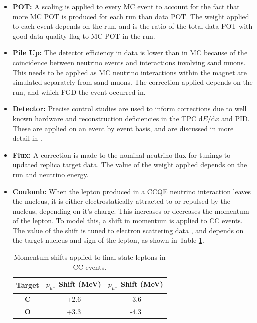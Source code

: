 \begin{itemize}

\item \textbf{POT: } A scaling is applied to every MC event to account for the fact that more MC POT is produced for each run than data POT. The weight applied to each event depends on the run, and is the ratio of the total data POT with good data quality flag to MC POT in the run.

\item \textbf{Pile Up: } The detector efficiency in data is lower than in MC because of the coincidence between neutrino events and interactions involving sand muons. This needs to be applied as MC neutrino interactions within the magnet are simulated separately from sand muons. The correction applied depends on the run, and which FGD the event occurred in.

\item \textbf{Detector: } Precise control studies are used to inform corrections due to well known hardware and reconstruction deficiencies in the TPC d$E/$d$x$ and PID. These are applied on an event by event basis, and are discussed in more detail in \cite{tn212}.

\item \textbf{Flux: } A correction is made to the nominal neutrino flux for tunings to updated replica target data. The value of the weight applied depends on the run and neutrino energy.

\item \textbf{Coulomb: } When the lepton produced in a CCQE neutrino interaction leaves the nucleus, it is either electrostatically attracted to or repulsed by the nucleus, depending on it's charge. This increases or decreases the momentum of the lepton. To model this, a shift in momentum is applied to CC events. The value of the shift is tuned to electron scattering data \cite{coulombcorr}, and depends on the target nucleus and sign of the lepton, as shown in Table \ref{tab:coulomb}.

\begin{center}
\begin{table}
\center
\begin{tabular}{ c||c|c}
\hline
\hline
\textbf{Target} & \textbf{$p_{\mu^{+}}$ Shift (MeV)} & \textbf{$p_{\mu^{-}}$ Shift (MeV)} \\
\hline
\hline
\textbf{C} & +2.6 & -3.6\\
\textbf{O} & +3.3 & -4.3\\ 
\hline
\hline
\end{tabular}
\caption{Momentum shifts applied to final state leptons in CC events.}
\label{tab:coulomb}
\end{table}
\end{center}

\end{itemize}


